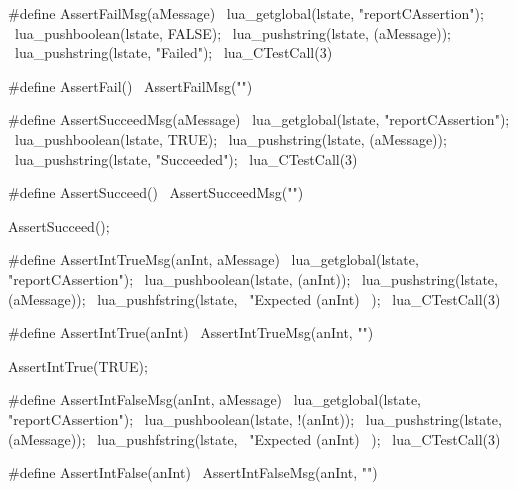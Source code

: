 \startCHeader
#define AssertFailMsg(aMessage)              \
  lua_getglobal(lstate, "reportCAssertion"); \
  lua_pushboolean(lstate, FALSE);            \
  lua_pushstring(lstate, (aMessage));        \
  lua_pushstring(lstate, "Failed");          \
  lua_CTestCall(3)
  
#define AssertFail() \
  AssertFailMsg("")
\stopCHeader

\stopTestSuite

\startTestSuite[assertSucceed]

\startCHeader
#define AssertSucceedMsg(aMessage)           \
  lua_getglobal(lstate, "reportCAssertion"); \
  lua_pushboolean(lstate, TRUE);             \
  lua_pushstring(lstate, (aMessage));        \
  lua_pushstring(lstate, "Succeeded");       \
  lua_CTestCall(3)

#define AssertSucceed() \
  AssertSucceedMsg("")
\stopCHeader


\startCTest
  AssertSucceed();
\stopCTest
\stopTestCase

\stopTestSuite

\startTestSuite[assertIntTrue]

\startCHeader
#define AssertIntTrueMsg(anInt, aMessage)    \
  lua_getglobal(lstate, "reportCAssertion"); \
  lua_pushboolean(lstate, (anInt));          \
  lua_pushstring(lstate, (aMessage));        \
  lua_pushfstring(lstate,                    \
      "Expected %
      (anInt)                                \
    );                                       \
  lua_CTestCall(3)

#define AssertIntTrue(anInt) \
  AssertIntTrueMsg(anInt, "")
\stopCHeader

\startTestCase[should succeed if true]
\startCTest
  AssertIntTrue(TRUE);
\stopCTest
\stopTestCase
\stopTestSuite

\startTestSuite[assertIntFalse]

\startCHeader
#define AssertIntFalseMsg(anInt, aMessage)   \
  lua_getglobal(lstate, "reportCAssertion"); \
  lua_pushboolean(lstate, !(anInt));         \
  lua_pushstring(lstate, (aMessage));        \
  lua_pushfstring(lstate,                    \
      "Expected %
      (anInt)                                \
    );                                       \
  lua_CTestCall(3)

#define AssertIntFalse(anInt) \
  AssertIntFalseMsg(anInt, "")
\stopCHeader

